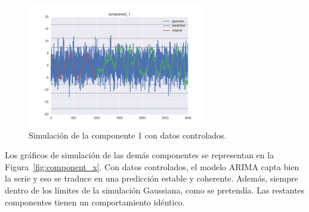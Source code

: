 \documentclass[11pt,spanish,listoffigures,listoftables]{tfgetsinf}
\begin{document}
    \begin{figure}[H]
        \centering
        \includegraphics[width=0.7\textwidth]{simulated_data_8_columns/component_1.png}
        \caption{Simulación de la componente 1 con datos controlados.}
        \label{fig:component_1}
    \end{figure}
    
    Los gráficos de simulación de las demás componentes se representan en la Figura~\ref{fig:component_x}. Con datos controlados, el modelo ARIMA capta bien la serie y eso se traduce en una predicción estable y coherente. Además, siempre dentro de los límites de la simulación Gaussiana, como se pretendía. Las restantes componentes tienen un comportamiento idéntico.
    
\end{document}
